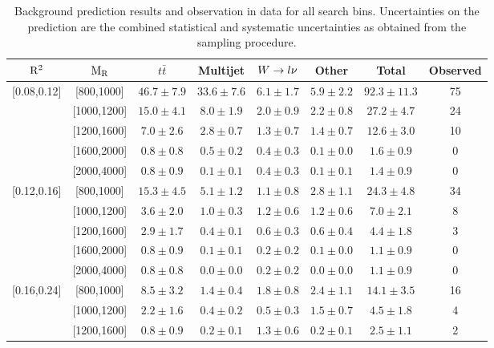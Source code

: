 \begin{sidewaystable}[htpb]
\centering
\caption{Background prediction results and observation in data for all search bins. Uncertainties on the prediction are the combined statistical and systematic uncertainties as obtained from the sampling procedure. \label{tab:results_prediction}}
\vspace{1eM}
{\normalsize
\begin{tabular}{ c  c | c  c  c  c | c | c }
\toprule
$\mathrm{R^2}$ & $\mathrm{M_R}$& $t\bar{t}$ & Multijet & $W\rightarrow l \nu$ & Other & Total & Observed\\ 
\midrule
\multirow{5}{*}{[0.08,0.12]} & [800,1000] & $46.7 \pm 7.9$ & $33.6 \pm 7.6$ & $6.1 \pm 1.7$ & $5.9 \pm 2.2$ & $92.3 \pm 11.3$ & 75 \\ 
 & [1000,1200] & $15.0 \pm 4.1$ & $8.0 \pm 1.9$ & $2.0 \pm 0.9$ & $2.2 \pm 0.8$ & $27.2 \pm 4.7$ & 24 \\ 
 & [1200,1600] & $7.0 \pm 2.6$ & $2.8 \pm 0.7$ & $1.3 \pm 0.7$ & $1.4 \pm 0.7$ & $12.6 \pm 3.0$ & 10 \\ 
 & [1600,2000] & $0.8 \pm 0.8$ & $0.5 \pm 0.2$ & $0.4 \pm 0.3$ & $0.1 \pm 0.0$ & $1.6 \pm 0.9$ & 0 \\ 
 & [2000,4000] & $0.8 \pm 0.9$ & $0.1 \pm 0.1$ & $0.4 \pm 0.3$ & $0.1 \pm 0.1$ & $1.4 \pm 0.9$ & 0 \\ 
\midrule 
\multirow{5}{*}{[0.12,0.16]} & [800,1000] & $15.3 \pm 4.5$ & $5.1 \pm 1.2$ & $1.1 \pm 0.8$ & $2.8 \pm 1.1$ & $24.3 \pm 4.8$ & 34 \\ 
 & [1000,1200] & $3.6 \pm 2.0$ & $1.0 \pm 0.3$ & $1.2 \pm 0.6$ & $1.2 \pm 0.6$ & $7.0 \pm 2.1$ & 8 \\ 
 & [1200,1600] & $2.9 \pm 1.7$ & $0.4 \pm 0.1$ & $0.6 \pm 0.3$ & $0.6 \pm 0.4$ & $4.4 \pm 1.8$ & 3 \\ 
 & [1600,2000] & $0.8 \pm 0.9$ & $0.1 \pm 0.1$ & $0.2 \pm 0.2$ & $0.1 \pm 0.0$ & $1.1 \pm 0.9$ & 0 \\ 
 & [2000,4000] & $0.8 \pm 0.8$ & $0.0 \pm 0.0$ & $0.2 \pm 0.2$ & $0.0 \pm 0.0$ & $1.1 \pm 0.9$ & 0 \\ 
\midrule 
\multirow{5}{*}{[0.16,0.24]} & [800,1000] & $8.5 \pm 3.2$ & $1.4 \pm 0.4$ & $1.8 \pm 0.8$ & $2.4 \pm 1.1$ & $14.1 \pm 3.5$ & 16 \\ 
 & [1000,1200] & $2.2 \pm 1.6$ & $0.4 \pm 0.2$ & $0.5 \pm 0.3$ & $1.5 \pm 0.7$ & $4.5 \pm 1.8$ & 4 \\ 
 & [1200,1600] & $0.8 \pm 0.9$ & $0.2 \pm 0.1$ & $1.3 \pm 0.6$ & $0.2 \pm 0.1$ & $2.5 \pm 1.1$ & 2 \\ 

\end{tabular}}
\end{sidewaystable}
